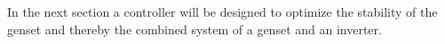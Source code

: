 In the next section a controller will be designed to optimize the stability of the genset and thereby the combined system of a genset and an inverter.


